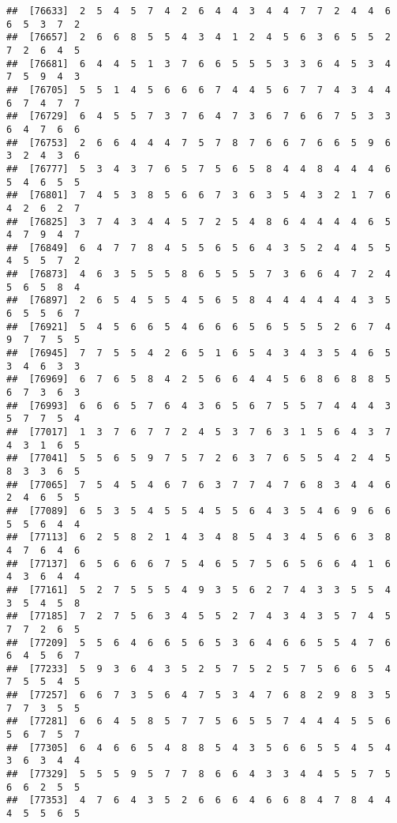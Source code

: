 \documentclass[
]{book}
\begin{document}
\begin{verbatim}
##  [76633]  2  5  4  5  7  4  2  6  4  4  3  4  4  7  7  2  4  4  6  6  5  3  7  2
##  [76657]  2  6  6  8  5  5  4  3  4  1  2  4  5  6  3  6  5  5  2  7  2  6  4  5
##  [76681]  6  4  4  5  1  3  7  6  6  5  5  5  3  3  6  4  5  3  4  7  5  9  4  3
##  [76705]  5  5  1  4  5  6  6  6  7  4  4  5  6  7  7  4  3  4  4  6  7  4  7  7
##  [76729]  6  4  5  5  7  3  7  6  4  7  3  6  7  6  6  7  5  3  3  6  4  7  6  6
##  [76753]  2  6  6  4  4  4  7  5  7  8  7  6  6  7  6  6  5  9  6  3  2  4  3  6
##  [76777]  5  3  4  3  7  6  5  7  5  6  5  8  4  4  8  4  4  4  6  5  4  6  5  5
##  [76801]  7  4  5  3  8  5  6  6  7  3  6  3  5  4  3  2  1  7  6  4  2  6  2  7
##  [76825]  3  7  4  3  4  4  5  7  2  5  4  8  6  4  4  4  4  6  5  4  7  9  4  7
##  [76849]  6  4  7  7  8  4  5  5  6  5  6  4  3  5  2  4  4  5  5  4  5  5  7  2
##  [76873]  4  6  3  5  5  5  8  6  5  5  5  7  3  6  6  4  7  2  4  5  6  5  8  4
##  [76897]  2  6  5  4  5  5  4  5  6  5  8  4  4  4  4  4  4  3  5  6  5  5  6  7
##  [76921]  5  4  5  6  6  5  4  6  6  6  5  6  5  5  5  2  6  7  4  9  7  7  5  5
##  [76945]  7  7  5  5  4  2  6  5  1  6  5  4  3  4  3  5  4  6  5  3  4  6  3  3
##  [76969]  6  7  6  5  8  4  2  5  6  6  4  4  5  6  8  6  8  8  5  6  7  3  6  3
##  [76993]  6  6  6  5  7  6  4  3  6  5  6  7  5  5  7  4  4  4  3  5  7  7  5  4
##  [77017]  1  3  7  6  7  7  2  4  5  3  7  6  3  1  5  6  4  3  7  4  3  1  6  5
##  [77041]  5  5  6  5  9  7  5  7  2  6  3  7  6  5  5  4  2  4  5  8  3  3  6  5
##  [77065]  7  5  4  5  4  6  7  6  3  7  7  4  7  6  8  3  4  4  6  2  4  6  5  5
##  [77089]  6  5  3  5  4  5  5  4  5  5  6  4  3  5  4  6  9  6  6  5  5  6  4  4
##  [77113]  6  2  5  8  2  1  4  3  4  8  5  4  3  4  5  6  6  3  8  4  7  6  4  6
##  [77137]  6  5  6  6  6  7  5  4  6  5  7  5  6  5  6  6  4  1  6  4  3  6  4  4
##  [77161]  5  2  7  5  5  5  4  9  3  5  6  2  7  4  3  3  5  5  4  3  5  4  5  8
##  [77185]  7  2  7  5  6  3  4  5  5  2  7  4  3  4  3  5  7  4  5  7  7  2  6  5
##  [77209]  5  5  6  4  6  6  5  6  5  3  6  4  6  6  5  5  4  7  6  6  4  5  6  7
##  [77233]  5  9  3  6  4  3  5  2  5  7  5  2  5  7  5  6  6  5  4  7  5  5  4  5
##  [77257]  6  6  7  3  5  6  4  7  5  3  4  7  6  8  2  9  8  3  5  7  7  3  5  5
##  [77281]  6  6  4  5  8  5  7  7  5  6  5  5  7  4  4  4  5  5  6  5  6  7  5  7
##  [77305]  6  4  6  6  5  4  8  8  5  4  3  5  6  6  5  5  4  5  4  3  6  3  4  4
##  [77329]  5  5  5  9  5  7  7  8  6  6  4  3  3  4  4  5  5  7  5  6  6  2  5  5
##  [77353]  4  7  6  4  3  5  2  6  6  6  4  6  6  8  4  7  8  4  4  4  5  5  6  5

\end{verbatim}
\end{document}
